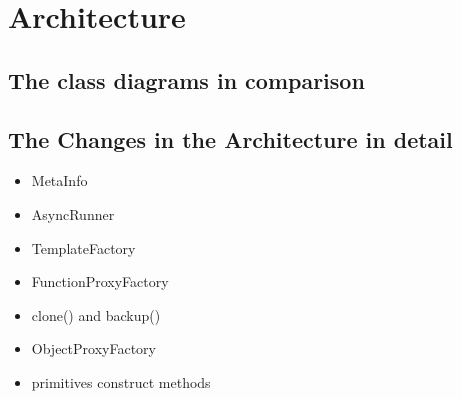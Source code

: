 \chapter{Architecture}
\section{The class diagrams in comparison}
	
\section{The Changes in the Architecture in detail}
\begin{itemize}
	\item MetaInfo
	\item AsyncRunner
	\item TemplateFactory
	\item FunctionProxyFactory
	\item clone() and backup()
	\item ObjectProxyFactory
	\item primitives construct methods
\end{itemize}



